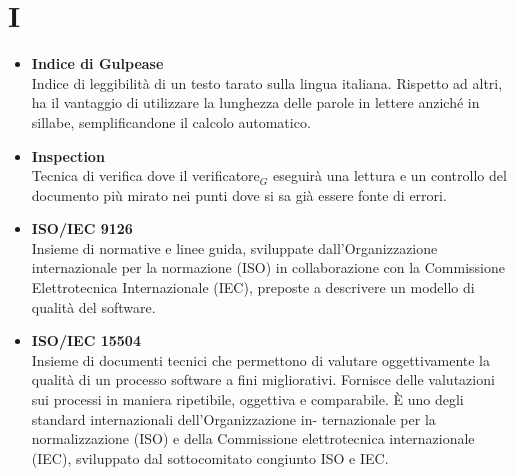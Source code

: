 \chapter{I} \label{I}
\begin{itemize}
	\item \textbf{Indice di Gulpease}\\
	Indice di leggibilità di un testo tarato sulla lingua italiana.
	Rispetto ad altri, ha il vantaggio di utilizzare la lunghezza delle parole in lettere anziché in sillabe, semplificandone il calcolo automatico.
	
	\item \textbf{Inspection}\\
	Tecnica di verifica dove il	verificatore$_G$ eseguirà una lettura e un controllo del documento più mirato nei punti dove si sa già essere fonte di errori.
		
	\item \textbf{ISO/IEC 9126}\\
	Insieme di normative e linee guida, sviluppate dall’Organizzazione internazionale per la
	normazione (ISO) in collaborazione con la Commissione Elettrotecnica Internazionale (IEC),
	preposte a descrivere un modello di qualità del software.
	
	\item \textbf{ISO/IEC 15504}\\
	Insieme di documenti tecnici che permettono di valutare oggettivamente la qualità di un processo software a fini migliorativi. 
	Fornisce delle valutazioni sui processi in maniera ripetibile, oggettiva e comparabile. È uno degli standard internazionali dell’Organizzazione in-	ternazionale per la normalizzazione (ISO) e della Commissione elettrotecnica internazionale
	(IEC), sviluppato dal sottocomitato congiunto ISO e IEC.

	
	
	
\end{itemize}
